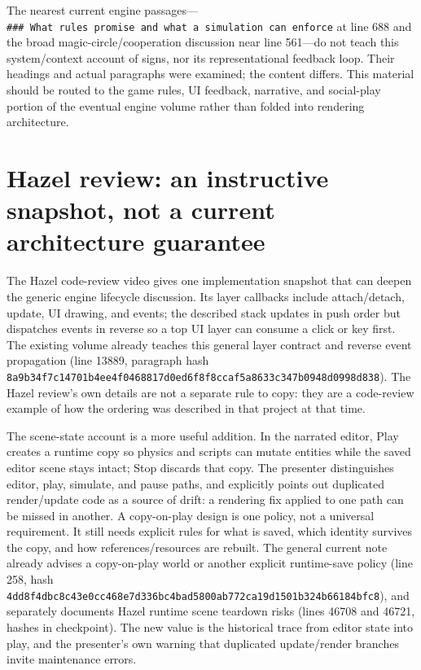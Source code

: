 The nearest current engine passages---\texttt{\#\#\#\ What\ rules\ promise\ and\ what\ a\ simulation\ can\ enforce} at line 688 and the broad magic-circle/cooperation discussion near line 561---do not teach this system/context account of signs, nor its representational feedback loop. Their headings and actual paragraphs were examined; the content differs. This material should be routed to the game rules, UI feedback, narrative, and social-play portion of the eventual engine volume rather than folded into rendering architecture.

\section{Hazel review: an instructive snapshot, not a current architecture guarantee}\label{06-engine-ii-ch046-hazel-review-an-instructive-snapshot-not-a-current-architecture-guarantee}

\hypertarget{06-engine-ii-ch046-hazel-review-an-instructive-snapshot-not-a-current-architecture-guarantee}{}

The Hazel code-review video gives one implementation snapshot that can deepen the generic engine lifecycle discussion. Its layer callbacks include attach/detach, update, UI drawing, and events; the described stack updates in push order but dispatches events in reverse so a top UI layer can consume a click or key first. The existing volume already teaches this general layer contract and reverse event propagation (line 13889, paragraph hash \texttt{8a9b34f7c14701b4ee4f0468817d0ed6f8f8ccaf5a8633c347b0948d0998d838}). The Hazel review's own details are not a separate rule to copy: they are a code-review example of how the ordering was described in that project at that time.

The scene-state account is a more useful addition. In the narrated editor, Play creates a runtime copy so physics and scripts can mutate entities while the saved editor scene stays intact; Stop discards that copy. The presenter distinguishes editor, play, simulate, and pause paths, and explicitly points out duplicated render/update code as a source of drift: a rendering fix applied to one path can be missed in another. A copy-on-play design is one policy, not a universal requirement. It still needs explicit rules for what is saved, which identity survives the copy, and how references/resources are rebuilt. The general current note already advises a copy-on-play world or another explicit runtime-save policy (line 258, hash \texttt{4dd8f4dbc8c43e0cc468e7d336bc4bad5800ab772ca19d1501b324b66184bfc8}), and separately documents Hazel runtime scene teardown risks (lines 46708 and 46721, hashes in checkpoint). The new value is the historical trace from editor state into play, and the presenter's own warning that duplicated update/render branches invite maintenance errors.

